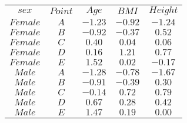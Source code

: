 \begin{tabular}{ccccc}
$sex$ & $Point$ & $Age$ & $BMI$ & $Height$\\
$Female$ & $A$ & $-1.23$ & $-0.92$ & $-1.24$\\
$Female$ & $B$ & $-0.92$ & $-0.37$ & $0.52$\\
$Female$ & $C$ & $0.40$ & $0.04$ & $0.06$\\
$Female$ & $D$ & $0.16$ & $1.21$ & $0.77$\\
$Female$ & $E$ & $1.52$ & $0.02$ & $-0.17$\\
$Male$ & $A$ & $-1.28$ & $-0.78$ & $-1.67$\\
$Male$ & $B$ & $-0.91$ & $-0.39$ & $0.30$\\
$Male$ & $C$ & $-0.14$ & $0.72$ & $0.79$\\
$Male$ & $D$ & $0.67$ & $0.28$ & $0.42$\\
$Male$ & $E$ & $1.47$ & $0.19$ & $0.00$\\
\end{tabular}
